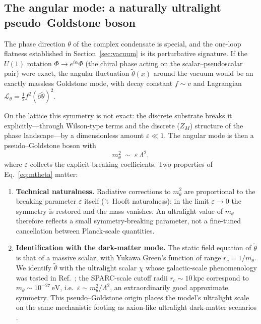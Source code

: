 \documentclass[11pt,a4paper]{article}
\begin{document}
\subsection{The angular mode: a naturally ultralight
pseudo--Goldstone boson}
\label{sec:angular}

The phase direction $\theta$ of the complex condensate is special,
and the one-loop flatness established in
Section~\ref{sec:vacuum} is its perturbative signature.
If the $U(1)$ rotation
$\Phi \to e^{i\alpha}\Phi$ (the chiral phase acting on the
scalar--pseudoscalar pair) were exact, the angular fluctuation
$\tilde{\theta}(x)$ around the vacuum would be an exactly massless
Goldstone mode, with decay constant $f \sim v$ and Lagrangian
$\mathcal{L}_\theta = \tfrac{1}{2}f^2(\partial\tilde\theta)^2$.

On the lattice this symmetry is not exact: the discrete substrate
breaks it explicitly---through Wilson-type terms and the discrete
($Z_M$) structure of the phase landscape---by a dimensionless
amount $\varepsilon \ll 1$.
The angular mode is then a pseudo--Goldstone boson with
\begin{equation}
m_\theta^2 \;\sim\; \varepsilon\,\Lambda^2 ,
\label{eq:mtheta}
\end{equation}
where $\varepsilon$ collects the explicit-breaking coefficients.
Two properties of Eq.~\eqref{eq:mtheta} matter:
\begin{enumerate}
\item \textbf{Technical naturalness.}
Radiative corrections to $m_\theta^2$ are proportional to the
breaking parameter $\varepsilon$ itself ('t~Hooft naturalness):
in the limit $\varepsilon \to 0$ the symmetry is restored and the
mass vanishes.
An ultralight value of $m_\theta$ therefore reflects a small
symmetry-breaking parameter, not a fine-tuned cancellation between
Planck-scale quantities.
\item \textbf{Identification with the dark-matter mode.}
The static field equation of $\tilde\theta$ is that of a massive
scalar, with Yukawa Green's function of range
$r_c = 1/m_\theta$.
We identify $\tilde\theta$ with the ultralight scalar $\chi$ whose
galactic-scale phenomenology was tested in
Ref.~\cite{Cheng:2025sparc}; the SPARC-scale cutoff radii
$r_c \sim 10\,\mathrm{kpc}$ correspond to
$m_\theta \sim 10^{-27}\,\mathrm{eV}$, i.e.\
$\varepsilon \sim m_\theta^2/\Lambda^2$, an extraordinarily good
approximate symmetry.
This pseudo--Goldstone origin places the model's ultralight scale
on the same mechanistic footing as axion-like ultralight
dark-matter scenarios \cite{Hui:2016ltb}.
\end{enumerate}
\end{document}
